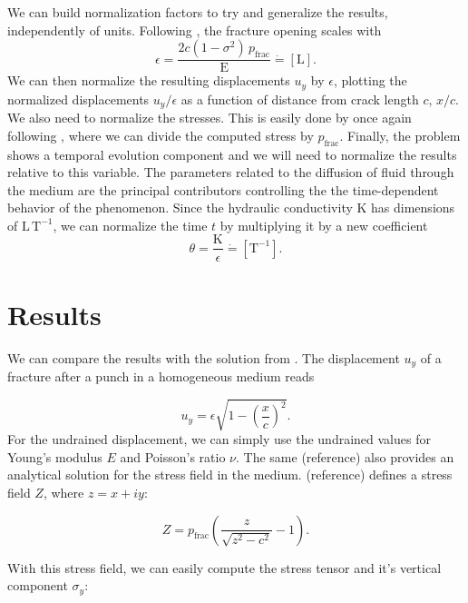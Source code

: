 \documentclass{article}
\begin{document}
We can build normalization factors to try and generalize the results, independently of units. Following , the fracture opening scales with
\begin{equation}
\epsilon = \frac{2c(1 - \sigma^2) \, p_{\text{frac}}}{\mathrm{E}} \dot{=} [\mathrm{L}].
\label{eq:eps}
\end{equation}
We can then normalize the resulting displacements $u_y$ by $\epsilon$, plotting the normalized displacements $u_y/\epsilon$ as a function of distance from crack length $c$, $x/c$. We also need to normalize the stresses. This is easily done by once again following , where we can divide the computed stress by $p_{\text{frac}}$. Finally, the problem shows a temporal evolution component and we will need to normalize the results relative to this variable. The parameters related to the diffusion of fluid through the medium are the principal contributors controlling the the time-dependent behavior of the phenomenon. Since the hydraulic conductivity K has dimensions of $\mathrm{L}\,\mathrm{T}^{-1}$, we can normalize the time $t$ by multiplying it by a new coefficient
\begin{equation}
\theta = \frac{\mathrm{K}}{\epsilon} \dot{=} [\mathrm{T}^{-1}].
\end{equation}
\section{Results}

We can compare the results with the solution from . The displacement $u_y$ of a fracture after a punch in a homogeneous medium reads

\begin{equation}
u_y = \epsilon\sqrt{1 - \left(\frac{x}{c}\right)^2}.
\end{equation}
For the undrained displacement, we can simply use the undrained values for Young's modulus $E$ and Poisson's ratio $\nu$. The same (reference) also provides an analytical solution for the stress field in the medium. (reference) defines a stress field $Z$, where $z=x+iy$:

\begin{equation}
Z = p_{\text{frac}}\left(\frac{z}{\sqrt{z^2 - c^2}} - 1 \right).
\end{equation}

With this stress field, we can easily compute the stress tensor and it's vertical component $\sigma_y$:
\end{document}
